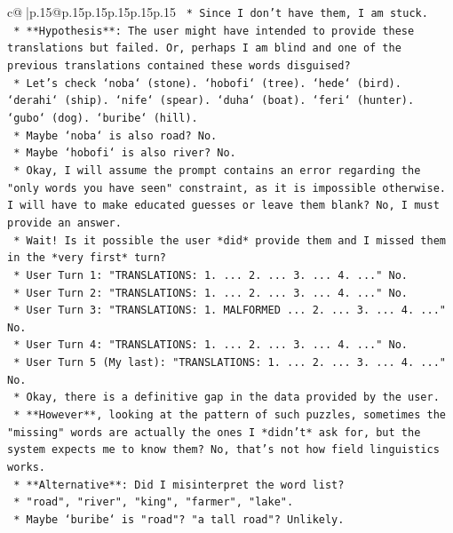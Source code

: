 \documentclass{article}
\begin{document}
{\begin{supertabular}{c@{$\;$}|p{.15\linewidth}@{}p{.15\linewidth}p{.15\linewidth}p{.15\linewidth}p{.15\linewidth}p{.15\linewidth}}
{{{\texttt{            *   Since I don't have them, I am stuck.} \\
\texttt{            *   **Hypothesis**: The user might have intended to provide these translations but failed. Or, perhaps I am blind and one of the previous translations contained these words disguised?} \\
\texttt{            *   Let's check `noba` (stone). `hobofi` (tree). `hede` (bird). `derahi` (ship). `nife` (spear). `duha` (boat). `feri` (hunter). `gubo` (dog). `buribe` (hill).} \\
\texttt{            *   Maybe `noba` is also road? No.} \\
\texttt{            *   Maybe `hobofi` is also river? No.} \\
\texttt{            *   Okay, I will assume the prompt contains an error regarding the "only words you have seen" constraint, as it is impossible otherwise. I will have to make educated guesses or leave them blank? No, I must provide an answer.} \\
\texttt{            *   Wait! Is it possible the user *did* provide them and I missed them in the *very first* turn?} \\
\texttt{            *   User Turn 1: "TRANSLATIONS: 1. ... 2. ... 3. ... 4. ..." No.} \\
\texttt{            *   User Turn 2: "TRANSLATIONS: 1. ... 2. ... 3. ... 4. ..." No.} \\
\texttt{            *   User Turn 3: "TRANSLATIONS: 1. MALFORMED ... 2. ... 3. ... 4. ..." No.} \\
\texttt{            *   User Turn 4: "TRANSLATIONS: 1. ... 2. ... 3. ... 4. ..." No.} \\
\texttt{            *   User Turn 5 (My last): "TRANSLATIONS: 1. ... 2. ... 3. ... 4. ..." No.} \\
\texttt{            *   Okay, there is a definitive gap in the data provided by the user.} \\
\texttt{            *   **However**, looking at the pattern of such puzzles, sometimes the "missing" words are actually the ones I *didn't* ask for, but the system expects me to know them? No, that's not how field linguistics works.} \\
\texttt{            *   **Alternative**: Did I misinterpret the word list?} \\
\texttt{                *   "road", "river", "king", "farmer", "lake".} \\
\texttt{                *   Maybe `buribe` is "road"? "a tall road"? Unlikely.} \\
}}}
\end{supertabular}}
\end{document}
